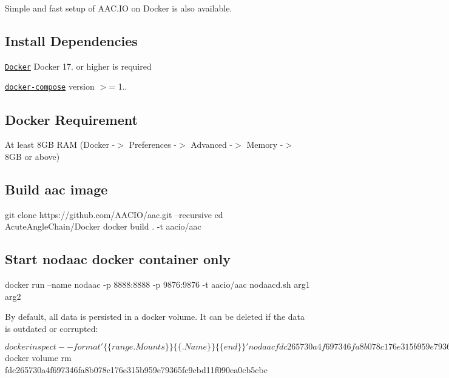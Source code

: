 Simple and fast setup of A\+A\+C.\+IO on Docker is also available.

\subsection*{Install Dependencies}


\begin{DoxyItemize}
\item \href{https://docs.docker.com}{\tt Docker} Docker 17. or higher is required
\item \href{https://docs.docker.com/compose/}{\tt docker-\/compose} version $>$= 1..
\end{DoxyItemize}

\subsection*{Docker Requirement}


\begin{DoxyItemize}
\item At least 8\+GB R\+AM (Docker -\/$>$ Preferences -\/$>$ Advanced -\/$>$ Memory -\/$>$ 8\+GB or above)
\end{DoxyItemize}

\subsection*{Build aac image}


\begin{DoxyCode}
git clone https://github.com/AACIO/aac.git --recursive
cd AcuteAngleChain/Docker
docker build . -t aacio/aac
\end{DoxyCode}


\subsection*{Start nodaac docker container only}


\begin{DoxyCode}
docker run --name nodaac -p 8888:8888 -p 9876:9876 -t aacio/aac nodaacd.sh arg1 arg2
\end{DoxyCode}


By default, all data is persisted in a docker volume. It can be deleted if the data is outdated or corrupted\+: 
\begin{DoxyCode}
$ docker inspect --format '\{\{ range .Mounts \}\}\{\{ .Name \}\} \{\{ end \}\}' nodaac
fdc265730a4f697346fa8b078c176e315b959e79365fc9cbd11f090ea0cb5cbc
$ docker volume rm fdc265730a4f697346fa8b078c176e315b959e79365fc9cbd11f090ea0cb5cbc
\end{DoxyCode}


